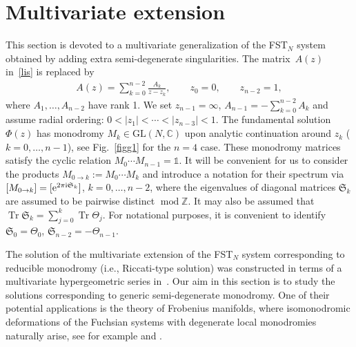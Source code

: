 \documentclass[pdftex]{sigma}
\newcommand\Cb{\mathbb{C}}
\newcommand\Zb{\mathbb{Z}}
\numberwithin{equation}{section}
\begin{document}
\section{Multivariate extension}
This section is devoted to a multivariate generalization of the FST$_N$ system obtained by adding extra semi-degenerate singularities. The matrix~$A(z)$ in~\eqref{lis} is replaced by
\begin{gather}\label{ffs}
A(z)=\sum_{k=0}^{n-2}\frac{A_k}{z-z_k},\qquad z_0=0,\qquad z_{n-2}=1,
\end{gather}
where $A_1,\ldots,A_{n-2}$ have rank 1. We set $z_{n-1}=\infty$, $A_{n-1}=-\sum\limits_{k=0}^{n-2}A_k$ and assume radial ordering: $0<|z_1|<\cdots <|z_{n-3}|<1$. The fundamental solution $\Phi(z)$ has monodromy $M_{k}\in\mathrm{GL}(N,\Cb)$ upon analytic continuation around $z_{k}$ ($k=0,\ldots,n-1$), see Fig.~\ref{figg1} for the $n=4$ case. These monodromy matrices satisfy the cyclic relation $M_0\cdots M_{n-1}=\mathds 1$.
It will be convenient for us to consider the products $M_{0\to k}:=M_0\cdots M_k$ and introduce a notation for their spectrum via $[M_{0\to k}]=[{\rm e}^{2\pi{\rm i}\mathfrak S_k}]$, $k=0,\ldots, n-2$, where the eigenvalues of diagonal matrices $\mathfrak S_k$ are assumed to be pairwise distinct $\operatorname{mod} \Zb$. It may also be assumed that $\operatorname{Tr}\mathfrak S_k=\sum\limits_{j=0}^k \operatorname{Tr}\Theta_{j}$. For notational purposes, it is convenient to identify $\mathfrak S_0=\Theta_0$, $\mathfrak S_{n-2}=-\Theta_{n-1}$.

\begin{Remark}The solution of the multivariate extension of the FST$_N$ system corresponding to reducible monodromy (i.e., Riccati-type solution) was constructed in terms of a multivariate hypergeometric series in~\cite{ManoTsuda,Tsuda2}. Our aim in this section is to study the solutions corresponding to generic semi-degenerate monodromy. One of their potential applications is the theory of Frobenius manifolds, where isomonodromic deformations of the Fuchsian systems with degenerate local monodromies naturally arise, see for example \cite[Section~3]{Dubrovin} and \cite[Section~8]{ChM}.
\end{Remark}
\end{document}
